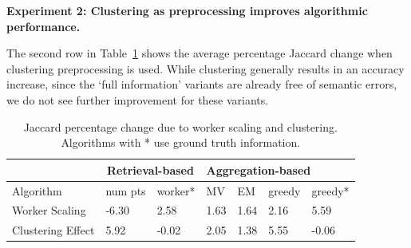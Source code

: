 \documentclass[letterpaper]{article}
\newcommand{\agp}[1]{\textcolor{magenta}{Aditya: #1}}
\newcommand{\dor}[1]{\textcolor{blue}{Doris: #1}}
\newcommand{\stitle}[1]{\noindent \textbf{#1}}
\begin{document}
\stitle{Experiment 2: Clustering as preprocessing improves algorithmic performance.}
\par \noindent The second row in Table~\ref{statsTable} shows the average percentage Jaccard change when clustering preprocessing is used. While clustering generally results in an accuracy increase, since the `full information' variants are already free of semantic errors, we do not see further improvement for these variants. %
\begin{table}[h!]
   \small
     \setlength\tabcolsep{1.5pt}
      \begin{tabular}{l|l|l|l|l|l|l}
         & \multicolumn{2}{c|}{Retrieval-based} & \multicolumn{4}{l}{Aggregation-based} \\ \hline
      Algorithm         & num pts         & worker*        & MV    & EM    & greedy  & greedy*  \\ \hline
      Worker Scaling    & -6.30           & 2.58               & 1.63  & 1.64  & 2.16    & 5.59         \\ \hline
      Clustering Effect & 5.92            & -0.02              & 2.05  & 1.38  & 5.55    & -0.06       
      \end{tabular}
      \caption{Jaccard percentage change due to worker scaling and clustering. Algorithms with * use ground truth information.}
      \label{statsTable}
\end{table}


\end{document}
